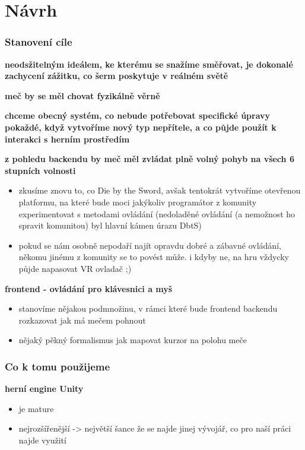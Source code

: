 \chapter{Návrh}

\subsection{Stanovení cíle}

\textbf{neodsžitelným ideálem, ke kterému se snažíme směřovat, je dokonalé zachycení zážitku, co šerm poskytuje v reálném světě}

\textbf{meč by se měl chovat fyzikálně věrně}

\textbf{chceme obecný systém, co nebude potřebovat specifické úpravy pokaždé, když vytvoříme nový typ nepřítele, a co půjde použít k interakci s herním prostředím}

\textbf{z pohledu backendu by meč měl zvládat plně volný pohyb na všech 6 stupních volnosti}
\begin{itemize}
    \item zkusíme znovu to, co Die by the Sword, avšak tentokrát vytvoříme otevřenou platformu, na které bude moci jakýkoliv programátor z komunity experimentovat s metodami ovládání (nedoladěné ovládání (a nemožnost ho spravit komunitou) byl hlavní kámen úrazu DbtS)
    \item pokud se nám osobně nepodaří najít opravdu dobré a zábavné ovládání, někomu jinému z komunity se to povést může. i kdyby ne, na hru vždycky půjde napasovat VR ovladač ;)
\end{itemize}

\textbf{frontend - ovládání pro klávesnici a myš}
\begin{itemize}
    \item stanovíme nějakou podmnožinu, v rámci které bude frontend backendu rozkazovat jak má mečem pohnout
    \item  nějaký pěkný formalismus jak mapovat kurzor na polohu meče
\end{itemize}


\subsection{Co k tomu použijeme}

\textbf{herní engine Unity}
\begin{itemize}
    \item je mature
    \item nejrozšířenější -> největší šance že se najde jinej vývojář, co pro naší práci najde využití
\end{itemize}

